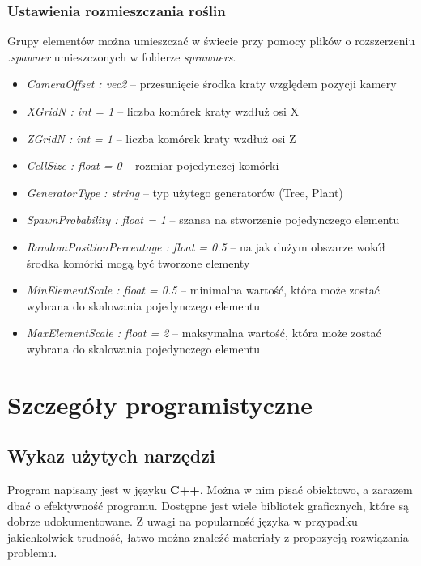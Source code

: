 \documentclass[inz,shortabstract]{iithesis}
\begin{document}
        \subsection{Ustawienia rozmieszczania roślin}
        Grupy elementów można umieszczać w świecie przy pomocy plików o rozszerzeniu
        \textit{.spawner} umieszczonych w folderze \textit{sprawners}.
        \begin{itemize}
            \item \textit{CameraOffset : vec2} -- przesunięcie środka kraty względem pozycji kamery
            \item \textit{XGridN : int = 1} -- liczba komórek kraty wzdłuż osi X
            \item \textit{ZGridN : int = 1} -- liczba komórek kraty wzdłuż osi Z
            \item \textit{CellSize : float = 0} -- rozmiar pojedynczej komórki
            \item \textit{GeneratorType : string} -- typ użytego generatorów (Tree, Plant)
            \item \textit{SpawnProbability : float = 1} -- szansa na stworzenie pojedynczego elementu 
            \item \textit{RandomPositionPercentage : float = 0.5} -- na jak dużym obszarze wokół środka komórki mogą być tworzone elementy
            \item \textit{MinElementScale : float = 0.5} -- minimalna wartość, która może zostać wybrana do skalowania pojedynczego elementu
            \item \textit{MaxElementScale : float = 2} -- maksymalna wartość, która może zostać wybrana do skalowania pojedynczego elementu
        \end{itemize}
    
        
\chapter{Szczegóły programistyczne}
    \section{Wykaz użytych narzędzi}
        Program napisany jest w języku \textbf{C++}. Można w nim pisać obiektowo, a zarazem dbać o efektywność programu. Dostępne jest wiele bibliotek graficznych, które są dobrze udokumentowane. Z uwagi na popularność języka w przypadku jakichkolwiek trudność, łatwo można znaleźć materiały z propozycją rozwiązania problemu.        
        
\end{document}
